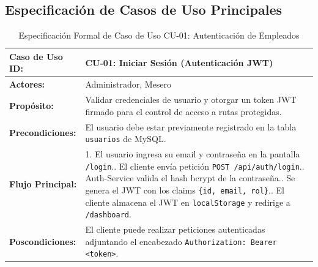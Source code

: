 \documentclass[12pt,a4paper]{article}
\begin{document}
\subsection{Especificación de Casos de Uso Principales}

\begin{table}[H]\small\centering
\caption{Especificación Formal de Caso de Uso CU-01: Autenticación de Empleados}
\begin{tabular}{|l|p{11cm}|}
\hline
\textbf{Caso de Uso ID:} & \textbf{CU-01: Iniciar Sesión (Autenticación JWT)} \\ \hline
\textbf{Actores:} & Administrador, Mesero \\ \hline
\textbf{Propósito:} & Validar credenciales de usuario y otorgar un token JWT firmado para el control de acceso a rutas protegidas. \\ \hline
\textbf{Precondiciones:} & El usuario debe estar previamente registrado en la tabla \texttt{usuarios} de MySQL. \\ \hline
\textbf{Flujo Principal:} & 
1. El usuario ingresa su email y contraseña en la pantalla \texttt{/login}.\newline
2. El cliente envía petición \texttt{POST /api/auth/login}.\newline
3. Auth-Service valida el hash bcrypt de la contraseña.\newline
4. Se genera el JWT con los claims \texttt{\{id, email, rol\}}.\newline
5. El cliente almacena el JWT en \texttt{localStorage} y redirige a \texttt{/dashboard}. \\ \hline
\textbf{Poscondiciones:} & El cliente puede realizar peticiones autenticadas adjuntando el encabezado \texttt{Authorization: Bearer <token>}. \\ \hline
\end{tabular}
\end{table}
\end{document}
